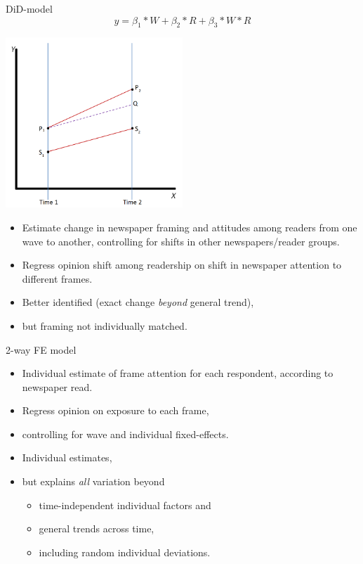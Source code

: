 \documentclass[
  ignorenonframetext,
]{beamer}
\providecommand{\tightlist}{%
  \setlength{\itemsep}{0pt}\setlength{\parskip}{0pt}}
\begin{document}
\begin{frame}[allowframebreaks]{DiD-model}
\protect\hypertarget{did-model}{}
\[y = \beta_1*W + \beta_2*R + \beta_3*W*R\]

\centering

\includegraphics[width=0.5\textwidth,height=\textheight]{vis/Illustration_of_Difference_in_Differences.png}

\framebreak

\begin{itemize}
\tightlist
\item
  Estimate change in newspaper framing and attitudes among readers from
  one wave to another, controlling for shifts in other newspapers/reader
  groups.
\item
  Regress opinion shift among readership on shift in newspaper attention
  to different frames.
\item
  Better identified (exact change \emph{beyond} general trend),
\item
  but framing not individually matched.
\end{itemize}
\end{frame}

\begin{frame}[allowframebreaks]{2-way FE model}
\protect\hypertarget{way-fe-model}{}
\begin{itemize}
\tightlist
\item
  Individual estimate of frame attention for each respondent, according
  to newspaper read.
\item
  Regress opinion on exposure to each frame,
\item
  controlling for wave and individual fixed-effects.
\end{itemize}

\framebreak

\begin{itemize}
\tightlist
\item
  Individual estimates,
\item
  but explains \emph{all} variation beyond

  \begin{itemize}
  \tightlist
  \item
    time-independent individual factors and
  \item
    general trends across time,
  \item
    including random individual deviations.
  \end{itemize}
\end{itemize}
\end{frame}
\end{document}
